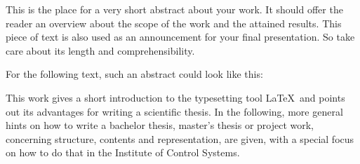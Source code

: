 This is the place for a very short abstract about your work. 
It should offer the reader an overview about the scope of the work and the attained results. 
This piece of text is also used as an announcement for your final presentation.
So take care about its length and comprehensibility.

For the following text, such an abstract could look like this:

This work gives a short introduction to the typesetting tool \LaTeX\ and points out its 
advantages for writing a scientific thesis. In the following, more general hints on how 
to write a bachelor thesis, master's thesis or project work, concerning structure, contents 
and representation, are given, with a special focus on how to do that in the Institute of Control Systems.